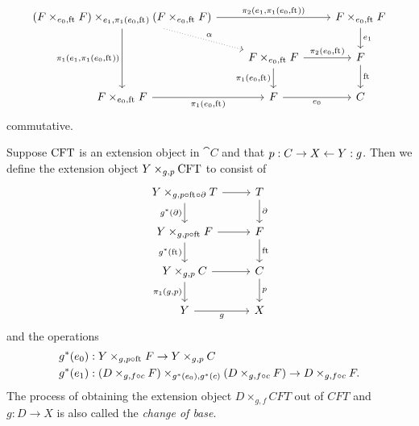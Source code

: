 \begin{defn}
\begin{equation*}
\begin{tikzcd}
\pullback{\stesysff}{\stesysff}{\efamext}{\pullbackpr{1}{\ectxext}{\eft}}
  \ar[dotted]{dr}{\alpha}
  \ar{rr}{\pullbackpr{2}{\efamext}{\pullbackpr{1}{\ectxext}{\eft}}}
  \ar{dd}[swap]{\pullbackpr{1}{\efamext}{\pullbackpr{1}{\ectxext}{\eft}}}
  & 
  &
\stesysff
  \ar{d}{\efamext}
  \\
  &
\stesysff
  \ar{d}[swap]{\pullbackpr{1}{\ectxext}{\eft}}
  \ar{r}{\pullbackpr{2}{\ectxext}{\eft}}
  &
\stesysf
  \ar{d}{\eft}
  \\
\stesysff
  \ar{r}[swap]{\pullbackpr{1}{\ectxext}{\eft}}
  &
\stesysf
  \ar{r}[swap]{\ectxext}
  &
\stesysc
\end{tikzcd}
\end{equation*}
commutative.
\end{defn}

\begin{defn}
Suppose $\mathrm{CFT}$ is an extension object in $\cat{C}$ and that $p:C\rightarrow X\leftarrow Y:g$.
Then we define the extension object $\cobesys{Y}{\stesys}{g}{p}$ to consist of
\begin{equation*}
\begin{tikzcd}
\cobesys{Y}{\stesyst}{g}{p\circ\eft\circ\ebd}
  \ar{r}
  \ar{d}[swap]{g^\ast(\ebd)}
  &
\stesyst
  \ar{d}{\ebd}
  \\
\cobesys{Y}{\stesysf}{g}{p\circ\eft}
  \ar{r}
  \ar{d}[swap]{g^\ast(\eft)}
  &
\stesysf
  \ar{d}{\eft}
  \\
\cobesys{Y}{\stesysc}{g}{p}
  \ar{r}
  \ar{d}[swap]{\pullbackpr{1}{g}{p}}
  &
\stesysc
  \ar{d}{p}
  \\
Y \ar{r}[swap]{g}
  &
X
\end{tikzcd}
\end{equation*} 
and the operations
\begin{align*}
g^\ast(\ectxext) & : \pullback{Y}{\stesysf}{g}{p\circ\eft}\to \pullback{Y}{\stesysc}{g}{p}\\
g^\ast(\efamext) & : (D\times_{g,f\circ c} F) \times_{g^\ast(e_0),g^\ast(c)} (D\times_{g,f\circ c} F)\to D\times_{g,f\circ c} F.
\end{align*}
The process of obtaining the extension object $D\times_{g,f} CFT$ out of $CFT$
and $g:D\to X$ is also called the \emph{change of base}.
\end{defn}

